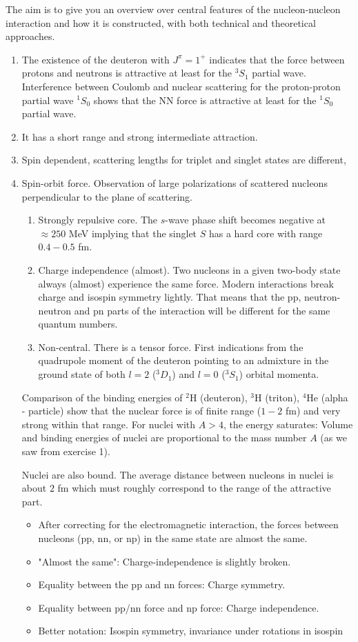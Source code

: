 The aim is to give you an overview over central features of the nucleon-nucleon interaction and how
it is constructed, with both technical and theoretical approaches. 
\begin{enumerate}
\item The existence of the deuteron with $J^{\pi}=1^+$ indicates that the force between protons and neutrons is attractive
at least for the $^3S_1$ partial wave. Interference between Coulomb and nuclear scattering for the proton-proton
partial wave $^1S_0$ shows that  the NN force is attractive at least for the $^1S_0$ partial wave. 
\item It has a short range and strong intermediate attraction.
\item Spin dependent, scattering lengths for triplet and singlet states are different,
\item Spin-orbit force. Observation of large polarizations of scattered nucleons perpendicular to the plane of scattering.
\begin{enumerate}
\item Strongly repulsive core. The $s$-wave phase shift becomes negative at $\approx 250$ MeV implying that the singlet $S$
has a hard core with range $0.4-0.5$ fm. 
\item Charge independence (almost). Two nucleons in a given two-body state always (almost) experience the same
force. Modern interactions break charge and isospin symmetry lightly. That means that the pp, neutron-neutron and pn 
parts of the 
interaction will be different for the same quantum numbers. 
\item Non-central. There is a tensor force. First indications from the quadrupole moment of the deuteron pointing to an
admixture in the ground state of both $l=2$ ($^3D_1$) and $l=0$ ($^3S_1$) orbital momenta.
\end{enumerate}

Comparison of the binding energies of
$^2$H (deuteron), $^3$H (triton), $^4$He (alpha - particle)
  show that the nuclear force is of finite range ($1-2$ fm) and
  very strong within that range.
For nuclei with $A>4$, the energy saturates: Volume
  and binding energies of nuclei are proportional to the
  mass number $A$ (as we saw from exercise 1).

Nuclei are also bound. The average distance
between nucleons in nuclei is about $2$ fm which
must roughly correspond to the range of the
attractive part.
\begin{itemize}
\item  After correcting for the electromagnetic interaction, the forces
  between nucleons (pp, nn, or np) in the same state are almost the
  same.
\item  "Almost the same": Charge-independence is slightly broken.
\item  Equality between the pp and nn forces: Charge symmetry.
\item  Equality between pp/nn force and np force: Charge independence.
\item Better notation: Isospin symmetry, invariance under rotations in isospin
\end{itemize}


\end{enumerate}
